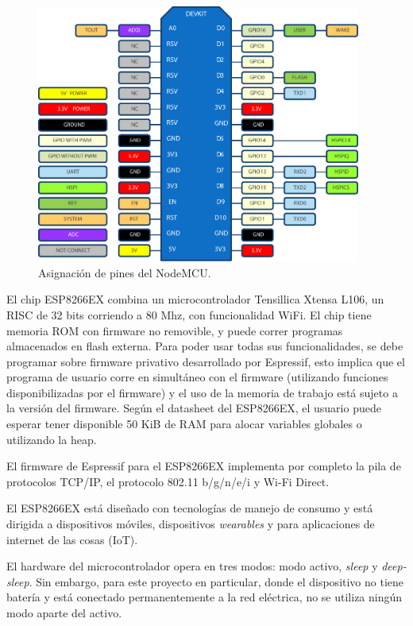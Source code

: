 \begin{figure}[ht!]
	\begin{center}
		\includegraphics[width=0.95\textwidth]{imagenes/nodemcu-pinout.pdf}
		\caption{Asignación de pines del NodeMCU.}
		\label{fig:nodemcu-pinout}
	\end{center}
\end{figure}

El chip ESP8266EX combina un microcontrolador Tensillica Xtensa L106, un RISC de 32 bits corriendo a 80 Mhz, con funcionalidad WiFi. \cite{ESP8266Datasheet} El chip tiene memoria ROM con firmware no removible, y puede correr programas almacenados en flash externa. Para poder usar todas sus funcionalidades, se debe programar sobre firmware privativo desarrollado por Espressif, esto implica que el programa de usuario corre en simultáneo con el firmware (utilizando funciones disponibilizadas por el firmware) y el uso de la memoria de trabajo está sujeto a la versión del firmware. Según el datasheet del ESP8266EX, el usuario puede esperar tener disponible 50 KiB de RAM para alocar variables globales o utilizando la heap.

El firmware de Espressif para el ESP8266EX implementa por completo la pila de protocolos TCP/IP, el protocolo 802.11 b/g/n/e/i y Wi-Fi Direct.

El ESP8266EX está diseñado con tecnologías de manejo de consumo y está dirigida a dispositivos móviles, dispositivos \emph{wearables} y para aplicaciones de internet de las cosas (IoT).

El hardware del microcontrolador opera en tres modos: modo activo, \emph{sleep} y \emph{deep-sleep}. Sin embargo, para este proyecto en particular, donde el dispositivo no tiene batería y está conectado permanentemente a la red eléctrica, no se utiliza ningún modo aparte del activo.

